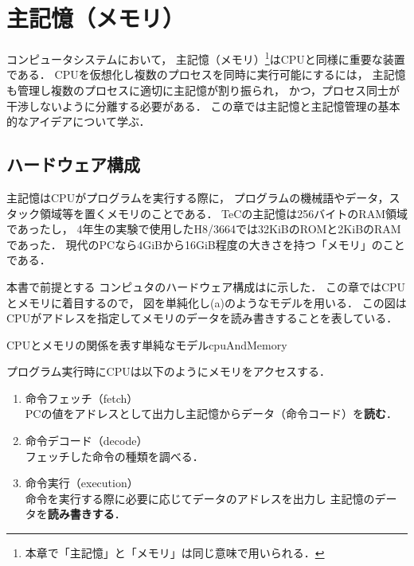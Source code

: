 \chapter{主記憶（メモリ）}
コンピュータシステムにおいて，
主記憶（メモリ）\footnote{
本章で「主記憶」と「メモリ」は同じ意味で用いられる．
}はCPUと同様に重要な装置である．
CPUを仮想化し複数のプロセスを同時に実行可能にするには，
主記憶も管理し複数のプロセスに適切に主記憶が割り振られ，
かつ，プロセス同士が干渉しないように分離する必要がある．
この章では主記憶と主記憶管理の基本的なアイデアについて学ぶ．

\section{ハードウェア構成}
主記憶はCPUがプログラムを実行する際に，
プログラムの機械語やデータ，スタック領域等を置くメモリのことである．
TeCの主記憶は256バイトのRAM領域であったし，
4年生の実験で使用したH8/3664では32KiBのROMと2KiBのRAMであった．
現代のPCなら4GiBから16GiB程度の大きさを持つ「メモリ」のことである．

本書で前提とする
コンピュタのハードウェア構成はに示した．
この章ではCPUとメモリに着目するので，
図を単純化し(a)のようなモデルを用いる．
この図はCPUがアドレスを指定してメモリのデータを読み書きすることを表している．

{CPUとメモリの関係を表す単純なモデル}{cpuAndMemory}

プログラム実行時にCPUは以下のようにメモリをアクセスする．
\begin{enumerate}
\item 命令フェッチ（fetch）\\
PCの値をアドレスとして出力し主記憶からデータ（命令コード）を{\bf 読む}．
\item 命令デコード（decode） \\
フェッチした命令の種類を調べる．
\item 命令実行（execution）\\
命令を実行する際に必要に応じてデータのアドレスを出力し
主記憶のデータを{\bf 読み書きする}．
\end{enumerate}

